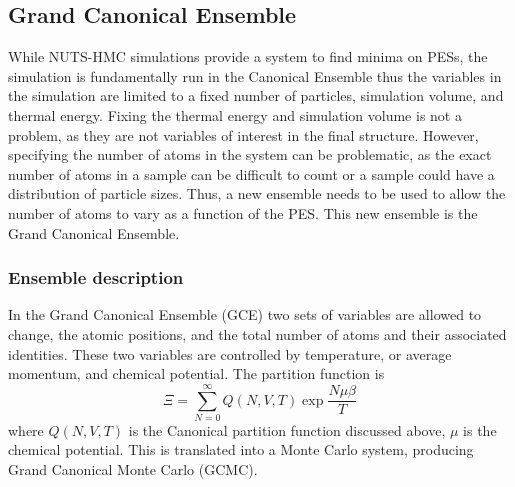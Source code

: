 \subsection{Grand Canonical Ensemble}
While NUTS-HMC simulations provide a system to find minima on PESs, the simulation is fundamentally run in the Canonical Ensemble thus the variables in the simulation are limited to a fixed number of particles, simulation volume, and thermal energy.
Fixing the thermal energy and simulation volume is not a problem, as they are not variables of interest in the final structure.
However, specifying the number of atoms in the system can be problematic, as the exact number of atoms in a sample can be difficult to count or a sample could have a distribution of particle sizes.
Thus, a new ensemble needs to be used to allow the number of atoms to vary as a function of the PES.
This new ensemble is the Grand Canonical Ensemble.

\subsubsection{Ensemble description}
In the Grand Canonical Ensemble (GCE) two sets of variables are allowed to change, the atomic positions, and the total number of atoms and their associated identities.
These two variables are controlled by temperature, or average momentum, and chemical potential.
The partition function is
\begin{equation}
  \Xi = \sum_{N=0}^{\infty} Q(N, V, T) \exp{\frac{N\mu\beta}{T}}
\end{equation}
where $Q(N, V, T)$ is the Canonical partition function discussed above, $\mu$ is the chemical potential. \cite{McQuarrie}
This is translated into a Monte Carlo system, producing Grand Canonical Monte Carlo (GCMC).
